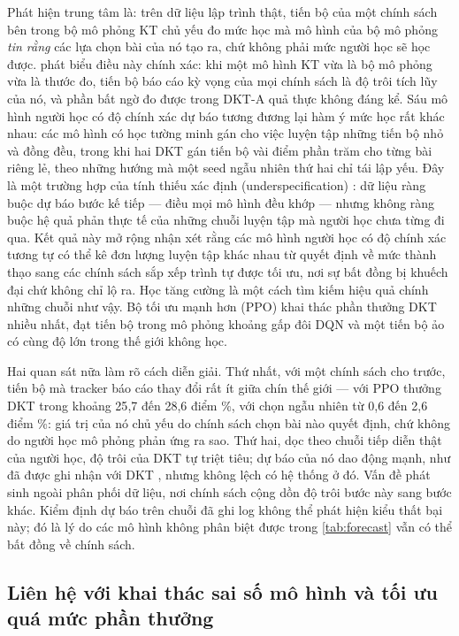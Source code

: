 \documentclass[a4paper,preprint,12pt,authoryear]{elsarticle}
\begin{document}
Phát hiện trung tâm là: trên dữ liệu lập trình thật, tiến bộ của một chính sách bên trong bộ mô phỏng KT chủ yếu đo mức học mà mô hình của bộ mô phỏng \emph{tin rằng} các lựa chọn bài của nó tạo ra, chứ không phải mức người học sẽ học được.  phát biểu điều này chính xác: khi một mô hình KT vừa là bộ mô phỏng vừa là thước đo, tiến bộ báo cáo kỳ vọng của mọi chính sách là độ trôi tích lũy của nó, và phần bất ngờ đo được trong DKT-A quả thực không đáng kể. Sáu mô hình người học có độ chính xác dự báo tương đương lại hàm ý mức học rất khác nhau: các mô hình có học tường minh gán cho việc luyện tập những tiến bộ nhỏ và đồng đều, trong khi hai DKT gán tiến bộ vài điểm phần trăm cho từng bài riêng lẻ, theo những hướng mà một seed ngẫu nhiên thứ hai chỉ tái lập yếu. Đây là một trường hợp của tính thiếu xác định (underspecification) \citep{damour2022underspecification}: dữ liệu ràng buộc dự báo bước kế tiếp — điều mọi mô hình đều khớp — nhưng không ràng buộc hệ quả phản thực tế của những chuỗi luyện tập mà người học chưa từng đi qua. Kết quả này mở rộng nhận xét rằng các mô hình người học có độ chính xác tương tự có thể kê đơn lượng luyện tập khác nhau \citep{lee2012individualizing,rollinson2015predictive} từ quyết định về mức thành thạo sang các chính sách sắp xếp trình tự được tối ưu, nơi sự bất đồng bị khuếch đại chứ không chỉ lộ ra. Học tăng cường là một cách tìm kiếm hiệu quả chính những chuỗi như vậy. Bộ tối ưu mạnh hơn (PPO) khai thác phần thưởng DKT nhiều nhất, đạt tiến bộ trong mô phỏng khoảng gấp đôi DQN và một tiến bộ ảo có cùng độ lớn trong thế giới không học.

Hai quan sát nữa làm rõ cách diễn giải. Thứ nhất, với một chính sách cho trước, tiến bộ mà tracker báo cáo thay đổi rất ít giữa chín thế giới — với PPO thưởng DKT trong khoảng 25{,}7 đến 28{,}6 điểm \%, với chọn ngẫu nhiên từ 0{,}6 đến 2{,}6 điểm \%: giá trị của nó chủ yếu do chính sách chọn bài nào quyết định, chứ không do người học mô phỏng phản ứng ra sao. Thứ hai, dọc theo chuỗi tiếp diễn thật của người học, độ trôi của DKT tự triệt tiêu; dự báo của nó dao động mạnh, như đã được ghi nhận với DKT \citep{yeung2018dktplus}, nhưng không lệch có hệ thống ở đó. Vấn đề phát sinh ngoài phân phối dữ liệu, nơi chính sách cộng dồn độ trôi bước này sang bước khác. Kiểm định dự báo trên chuỗi đã ghi log không thể phát hiện kiểu thất bại này; đó là lý do các mô hình không phân biệt được trong \cref{tab:forecast} vẫn có thể bất đồng về chính sách.

\subsection{Liên hệ với khai thác sai số mô hình và tối ưu quá mức phần thưởng}
\end{document}
